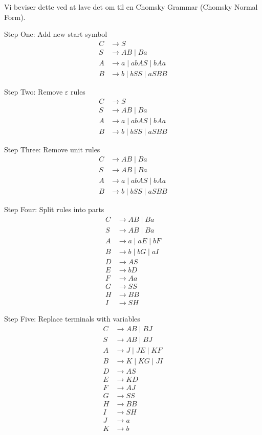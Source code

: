 Vi beviser dette ved at lave det om til en Chomsky Grammar (Chomsky Normal Form).

Step One: Add new start symbol
\begin{align*}
C &\to S \\
S &\to AB \mid Ba \\
A &\to a \mid abAS \mid bAa \\
B &\to b \mid bSS \mid aSBB
\end{align*}

Step Two: Remove \(\varepsilon\) rules
\begin{align*}
C &\to S \\
S &\to AB \mid Ba \\
A &\to a \mid abAS \mid bAa \\
B &\to b \mid bSS \mid aSBB
\end{align*}

Step Three: Remove unit rules
\begin{align*}
C &\to AB \mid Ba \\
S &\to AB \mid Ba \\
A &\to a \mid abAS \mid bAa \\
B &\to b \mid bSS \mid aSBB
\end{align*}

Step Four: Split rules into parts
\begin{align*}
C &\to AB \mid Ba \\
S &\to AB \mid Ba \\
A &\to a \mid aE \mid bF \\
B &\to b \mid bG \mid aI \\
D &\to AS \\
E &\to bD \\
F &\to Aa \\
G &\to SS \\
H &\to BB \\
I &\to SH
\end{align*}

Step Five: Replace terminals with variables
\begin{align*}
C &\to AB \mid BJ \\
S &\to AB \mid BJ \\
A &\to J \mid JE \mid KF \\
B &\to K \mid KG \mid JI \\
D &\to AS \\
E &\to KD \\
F &\to AJ \\
G &\to SS \\
H &\to BB \\
I &\to SH \\
J &\to a \\
K &\to b
\end{align*}


